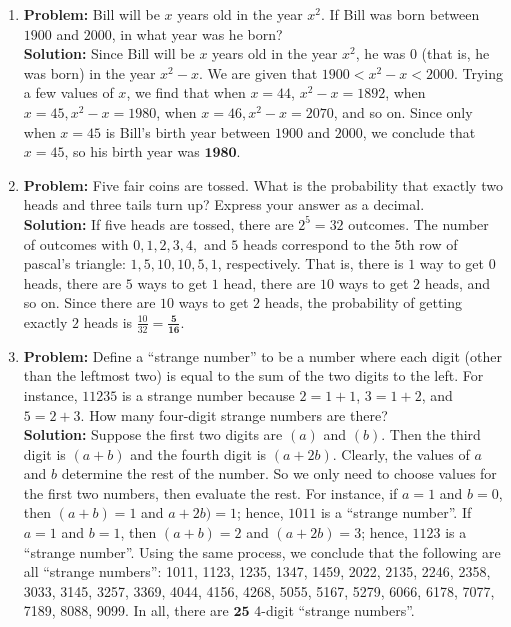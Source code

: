 \documentclass{article}
\begin{document}
\begin{enumerate}
\item \textbf{Problem:} Bill will be $x$ years old in the year $x^2$.  If Bill was born between $1900$ and $2000$, in what year was he born? \\

\textbf{Solution:} Since Bill will be $x$ years old in the year $x^2$, he was 0 (that is, he was born) in the year $x^2 - x$.  We are given that $1900 < x^2 - x < 2000$.  Trying a few values of $x$, we find that when $x = 44$, $x^2 - x = 1892$, when $x = 45, x^2 - x = 1980$, when $x = 46, x^2 - x = 2070$, and so on.  Since only when $x = 45$ is Bill's birth year between $1900$ and $2000$, we conclude that $x = 45$, so his birth year was $\mathbf{1980}$.

\item \textbf{Problem:} Five fair coins are tossed.  What is the probability that exactly two heads and three tails turn up?  Express your answer as a decimal. \\

\textbf{Solution:} If five heads are tossed, there are $2^5 = 32$ outcomes.  The number of outcomes with $0, 1, 2, 3, 4,$ and $5$ heads correspond to the 5th row of pascal's triangle: $1, 5, 10, 10, 5, 1$, respectively.  That is, there is $1$ way to get $0$ heads, there are $5$ ways to get $1$ head, there are $10$ ways to get $2$ heads, and so on.  Since there are $10$ ways to get $2$ heads, the probability of getting exactly $2$ heads is $\frac{10}{32} = \mathbf{\frac{5}{16}}$.

\item \textbf{Problem:} Define a ``strange number'' to be a number where each digit (other than the
leftmost two) is equal to the sum of the two digits to the left.  For
instance, $11235$ is a strange number because $2 = 1 + 1$, $3 = 1 + 2$, and $5 =  2
+ 3$.  How many four-digit strange numbers are there? \\

\textbf{Solution:} Suppose the first two digits are $(a)$ and $(b)$.  Then the third digit is
$(a+b)$ and the fourth digit is $(a+2b)$.  Clearly, the values of $a$ and $b$ determine
the rest of the number.  So we only need to choose values for the first two
numbers, then evaluate the rest.  For instance, if $a = 1$ and $b = 0$, then
$(a+b) = 1$ and $a+2b) = 1$; hence, $1011$ is a ``strange number''.  If $a = 1$ and $b
= 1$, then $(a+b) = 2$ and $(a+2b) = 3$; hence, $1123$ is a ``strange number''.
Using the same process, we conclude that the following are all ``strange
numbers'': 1011, 1123, 1235, 1347, 1459, 2022, 2135, 2246, 2358, 3033, 3145, 3257, 3369, 4044, 4156, 4268, 5055, 5167, 5279, 6066, 6178, 7077, 7189, 8088, 9099.  In all, there are $\mathbf{25}$ $4$-digit ``strange numbers''.


\end{enumerate}
\end{document}
